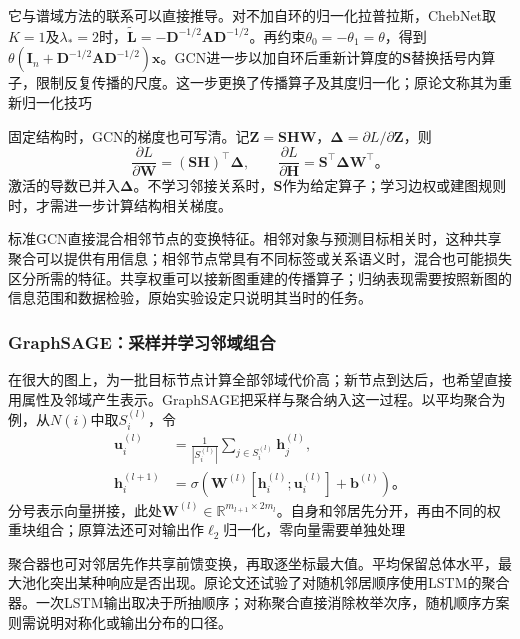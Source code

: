 它与谱域方法的联系可以直接推导。对不加自环的归一化拉普拉斯，ChebNet取$K=1$及$\lambda_*=2$时，$\widetilde{\bm{L}}=-\bm{D}^{-1/2}\bm{A}\bm{D}^{-1/2}$。再约束$\theta_0=-\theta_1=\theta$，得到$\theta(\bm{I}_n+\bm{D}^{-1/2}\bm{A}\bm{D}^{-1/2})\bm{x}$。GCN进一步以加自环后重新计算度的$\bm{S}$替换括号内算子，限制反复传播的尺度。这一步更换了传播算子及其度归一化；原论文称其为重新归一化技巧

固定结构时，GCN的梯度也可写清。记$\bm{Z}=\bm{S}\bm{H}\bm{W}$，$\bm{\Delta}=\partial L/\partial\bm{Z}$，则
\begin{equation}
  \frac{\partial L}{\partial\bm{W}}=(\bm{S}\bm{H})^{\top}\bm{\Delta},\qquad
  \frac{\partial L}{\partial\bm{H}}=\bm{S}^{\top}\bm{\Delta}\bm{W}^{\top}\text{。}
  \label{eq:gnn-gcn-backprop}
\end{equation}
激活的导数已并入$\bm{\Delta}$。不学习邻接关系时，$\bm{S}$作为给定算子；学习边权或建图规则时，才需进一步计算结构相关梯度。

标准GCN直接混合相邻节点的变换特征。相邻对象与预测目标相关时，这种共享聚合可以提供有用信息；相邻节点常具有不同标签或关系语义时，混合也可能损失区分所需的特征。共享权重可以接新图重建的传播算子；归纳表现需要按照新图的信息范围和数据检验，原始实验设定只说明其当时的任务。

\subsubsection{GraphSAGE：采样并学习邻域组合}
\label{sec:gnn-graphsage}

在很大的图上，为一批目标节点计算全部邻域代价高；新节点到达后，也希望直接用属性及邻域产生表示。GraphSAGE把采样与聚合纳入这一过程。以平均聚合为例，从$N(i)$中取$S_i^{(l)}$，令
\begin{equation}
  \begin{aligned}
    \bm{u}_i^{(l)}&=\frac{1}{|S_i^{(l)}|}\sum_{j\in S_i^{(l)}}\bm{h}_j^{(l)},\\
    \bm{h}_i^{(l+1)}&=\sigma\!\left(
      \bm{W}^{(l)}[\bm{h}_i^{(l)};\bm{u}_i^{(l)}]+\bm{b}^{(l)}\right)\text{。}
  \end{aligned}
  \label{eq:gnn-graphsage}
\end{equation}
分号表示向量拼接，此处$\bm{W}^{(l)}\in\mathbb{R}^{m_{l+1}\times2m_l}$。自身和邻居先分开，再由不同的权重块组合；原算法还可对输出作$\ell_2$归一化，零向量需要单独处理

聚合器也可对邻居先作共享前馈变换，再取逐坐标最大值。平均保留总体水平，最大池化突出某种响应是否出现。原论文还试验了对随机邻居顺序使用LSTM的聚合器。一次LSTM输出取决于所抽顺序；对称聚合直接消除枚举次序，随机顺序方案则需说明对称化或输出分布的口径。

